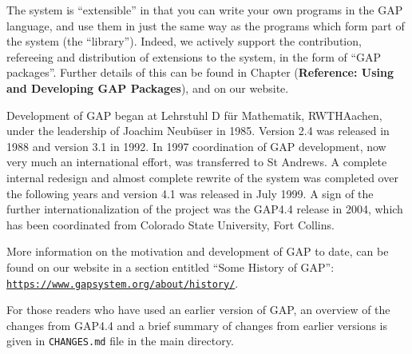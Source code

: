 \documentclass[a4paper,11pt]{report}
\begin{document}
{{ The system is ``extensible'' in that you can write your own programs in the \textsf{GAP} language, and use them in just the same way as the programs which form part of
the system (the ``library''). Indeed, we actively support the contribution, refereeing and distribution
of extensions to the system, in the form of ``\textsf{GAP} packages''. Further details of this can be found in Chapter  (\textbf{Reference: Using and Developing GAP Packages}), and on our website. 

 Development of \textsf{GAP} began at Lehrstuhl D f{\"u}r Mathematik, RWTH\texttt{}Aachen, under
the leadership of Joachim Neub{\"u}ser in 1985. Version 2.4 was released in
1988 and version 3.1 in 1992. In 1997 coordination of \textsf{GAP} development, now very much an international effort, was transferred to St
Andrews. A complete internal redesign and almost complete rewrite of the
system was completed over the following years and version 4.1 was released in
July 1999. A sign of the further internationalization of the project was the \textsf{GAP}{\nobreakspace}4.4 release in 2004, which has been coordinated from Colorado
State University, Fort Collins. 

 More information on the motivation and development of \textsf{GAP} to date, can be found on our website in a section entitled ``Some History of \textsf{GAP}'': \href{https://www.gap-system.org/about/history/} {\texttt{https://www.gap\texttt{}system.org/about/history/}}. 

 For those readers who have used an earlier version of \textsf{GAP}, an overview of the changes from \textsf{GAP}{\nobreakspace}4.4 and a brief summary of changes from earlier versions is
given in \texttt{CHANGES.md} file in the main directory. 

}}
\end{document}
